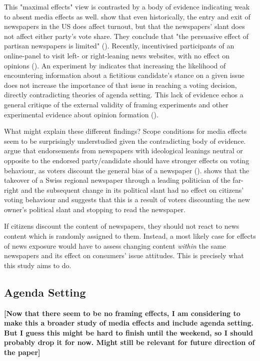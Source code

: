 \documentclass{article}
\begin{document}
This "maximal effects" view is contrasted by a body of evidence indicating weak to absent media effects as well. \citeauthor{Gentzkow2011} show that even historically, the entry and exit of newspapers in the US does affect turnout, but that the newspapers' slant does not affect either party's vote share. They conclude that "the persuasive effect of partisan newspapers is limited" (\citeyear[3011]{Gentzkow2011}). Recently, \citeauthor{Guess2021} incentivised participants of an online-panel to visit left- or right-leaning news websites, with no effect on opinions (\citeyear{Guess2021}). An experiment by \citeauthor{Lau2021} indicates that increasing the likelihood of encountering information about a fictitious candidate's stance on a given issue does not increase the importance of that issue in reaching a voting decision, directly contradicting theories of agenda setting. This lack of evidence echos a general critique of the external validity of framing experiments and other experimental evidence about opinion formation (\cite{Barabas2010, Busby2019, Leeper2020}).

What might explain these different findings? Scope conditions for media effects seem to be surprisingly understudied given the contradicting body of evidence. \citeauthor{Chiang2011a} argue that endorsements from newspapers with ideological leanings neutral or opposite to the endorsed party/candidate should have stronger effects on voting behaviour, as voters discount the general bias of a newspaper (\citeyear{Chiang2011a}). \citeauthor{Spirig2020} shows that the takeover of a Swiss regional newspaper through a leading politician of the far-right and the subsequent change in its political slant had no effect on citizens' voting behaviour and suggests that this is a result of voters discounting the new owner's political slant and stopping to read the newspaper.

If citizens discount the content of newspapers, they should not react to news content which is randomly assigned to them. Instead, a most likely case for effects of news exposure would have to assess changing content \textit{within} the same newspapers and its effect on consumers' issue attitudes. This is precisely what this study aims to do.

\subsection{Agenda Setting}

\textbf{[Now that there seem to be no framing effects, I am considering to make this a broader study of media effects and include agenda setting. But I guess this might be hard to finish until the weekend, so I should probably drop it for now. Might still be relevant for future direction of the paper]}\medskip
\end{document}
